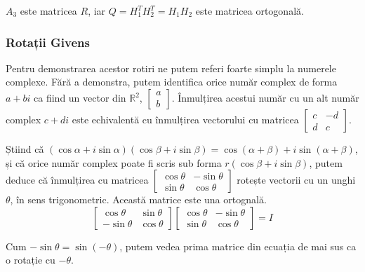\documentclass{exam}
\begin{document}
$A_3$ este matricea $R$, iar $Q = H_1^T H_2^T = H_1 H_2$ este matricea ortogonală.

\subsubsection{Rotații Givens}

Pentru demonstrarea acestor rotiri ne putem referi foarte simplu la numerele
complexe. Fără a demonstra, putem identifica orice număr complex de forma $a + bi$
ca fiind un vector din $\mathbb{R}^2$, $\begin{bmatrix} a \\ b \end{bmatrix}$.
Înmulțirea acestui număr cu un alt număr complex $c + di$ este echivalentă cu
înmulțirea vectorului cu matricea $\begin{bmatrix} c & -d \\ d & c \end{bmatrix}$.

Știind că $ (\cos \alpha + i \sin \alpha)(\cos \beta + i \sin \beta) = \cos(\alpha + \beta) + i \sin(\alpha + \beta)$,
și că orice număr complex poate fi scris sub forma $r(\cos \beta + i \sin \beta)$,
putem deduce că înmulțirea cu matricea $\begin{bmatrix} \cos \theta & -\sin \theta \\ \sin \theta & \cos \theta \end{bmatrix}$
rotește vectorii cu un unghi $\theta$, în sens trigonometric. Această matrice
este una ortognală.
\begin{equation*}
	\begin{bmatrix} \cos \theta & \sin \theta \\ -\sin \theta & \cos \theta \end{bmatrix} \begin{bmatrix} \cos \theta & -\sin \theta \\ \sin \theta & \cos \theta \end{bmatrix} = I
\end{equation*}

Cum $-\sin \theta = \sin(-\theta)$, putem vedea prima matrice din ecuația de mai
sus ca o rotație cu $-\theta$.
\end{document}
